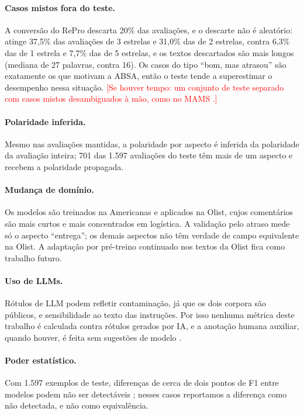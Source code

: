 \documentclass[12pt,a4paper]{article}
\newcommand{\pendente}[1]{\textcolor{red}{[#1]}}
\begin{document}
\paragraph{Casos mistos fora do teste.} A conversão do RePro descarta 20\% das avaliações, e o descarte não é aleatório: atinge 37,5\% das avaliações de 3 estrelas e 31,0\% das de 2 estrelas, contra 6,3\% das de 1 estrela e 7,7\% das de 5 estrelas, e os textos descartados são mais longos (mediana de 27 palavras, contra 16). Os casos do tipo ``bom, mas atrasou'' são exatamente os que motivam a ABSA, então o teste tende a superestimar o desempenho nessa situação. \pendente{Se houver tempo: um conjunto de teste separado com casos mistos desambiguados à mão, como no MAMS \citep{jiang2019mams}.}

\paragraph{Polaridade inferida.} Mesmo nas avaliações mantidas, a polaridade por aspecto é inferida da polaridade da avaliação inteira; 701 das 1.597 avaliações do teste têm mais de um aspecto e recebem a polaridade propagada.

\paragraph{Mudança de domínio.} Os modelos são treinados na Americanas e aplicados na Olist, cujos comentários são mais curtos e mais concentrados em logística. A validação pelo atraso mede só o aspecto ``entrega''; os demais aspectos não têm verdade de campo equivalente na Olist. A adaptação por pré-treino continuado nos textos da Olist \citep{gururangan2020dont} fica como trabalho futuro.

\paragraph{Uso de LLMs.} Rótulos de LLM podem refletir contaminação, já que os dois corpora são públicos, e sensibilidade ao texto das instruções. Por isso nenhuma métrica deste trabalho é calculada contra rótulos gerados por IA, e a anotação humana auxiliar, quando houver, é feita sem sugestões de modelo \citep{schroeder2025hitl}.

\paragraph{Poder estatístico.} Com 1.597 exemplos de teste, diferenças de cerca de dois pontos de F1 entre modelos podem não ser detectáveis \citep{card2020power}; nesses casos reportamos a diferença como não detectada, e não como equivalência.
\end{document}
